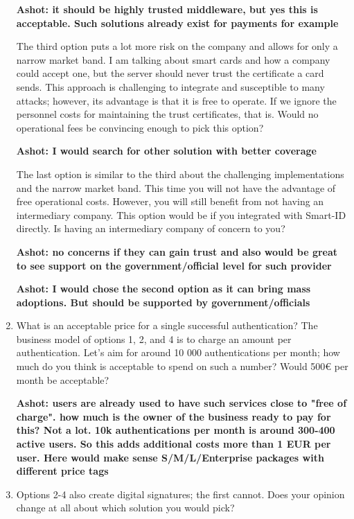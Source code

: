 \begin{enumerate}
    \textbf{Ashot: it should be highly trusted middleware, but yes this is acceptable. Such solutions already exist for payments for example}

    The third option puts a lot more risk on the company and allows for only a narrow market band. I am talking about smart cards and how a company could accept one, but the server should never trust the certificate a card sends. This approach is challenging to integrate and susceptible to many attacks; however, its advantage is that it is free to operate. If we ignore the personnel costs for maintaining the trust certificates, that is. Would no operational fees be convincing enough to pick this option?

    \textbf{Ashot: I would search for other solution with better coverage}

    The last option is similar to the third about the challenging implementations and the narrow market band. This time you will not have the advantage of free operational costs. However, you will still benefit from not having an intermediary company. This option would be if you integrated with Smart-ID directly. Is having an intermediary company of concern to you?

    \textbf{Ashot: no concerns if they can gain trust and also would be great to see support on the government/official level for such provider}

    \textbf{Ashot: I would chose the second option as it can bring mass adoptions. But should be supported by government/officials}

    \item What is an acceptable price for a single successful authentication? The business model of options 1, 2, and 4 is to charge an amount per authentication. Let's aim for around 10 000 authentications per month; how much do you think is acceptable to spend on such a number? Would 500€ per month be acceptable?
    
    \textbf{Ashot: users are already used to have such services close to "free of charge". how much is the owner of the business ready to pay for this? Not a lot. 10k authentications per month is around 300-400 active users. So this adds additional costs more than 1 EUR per user.
    Here would make sense S/M/L/Enterprise packages with different price tags}
    \item Options 2-4 also create digital signatures; the first cannot. Does your opinion change at all about which solution you would pick?
    

\end{enumerate}
